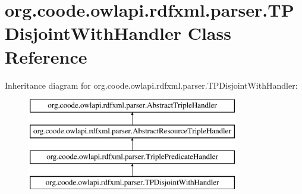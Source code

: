 \hypertarget{classorg_1_1coode_1_1owlapi_1_1rdfxml_1_1parser_1_1_t_p_disjoint_with_handler}{\section{org.\-coode.\-owlapi.\-rdfxml.\-parser.\-T\-P\-Disjoint\-With\-Handler Class Reference}
\label{classorg_1_1coode_1_1owlapi_1_1rdfxml_1_1parser_1_1_t_p_disjoint_with_handler}
}
Inheritance diagram for org.\-coode.\-owlapi.\-rdfxml.\-parser.\-T\-P\-Disjoint\-With\-Handler\-:\begin{figure}[H]
\begin{center}
\leavevmode
\includegraphics[height=4.000000cm]{classorg_1_1coode_1_1owlapi_1_1rdfxml_1_1parser_1_1_t_p_disjoint_with_handler}
\end{center}
\end{figure}
